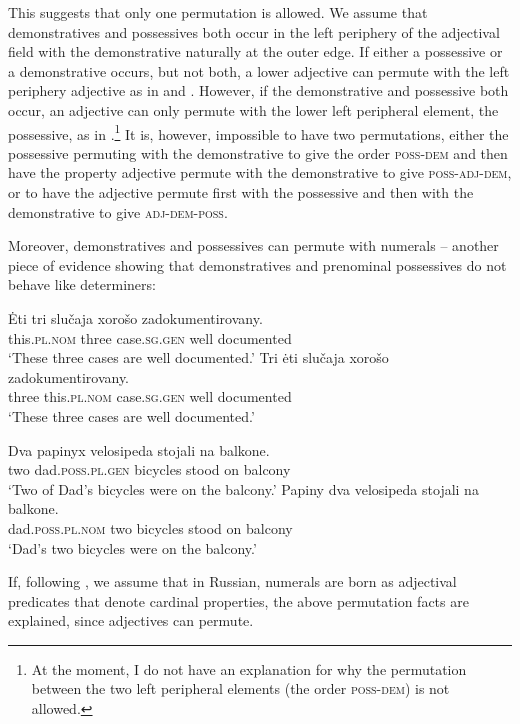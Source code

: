 \documentclass[output=paper,
colorlinks,
citecolor=brown,
newtxmath
]{langscibook}
\begin{document}
\noindent This suggests that only one permutation is allowed. We assume that demonstratives and possessives both occur in the left periphery of the adjectival field with the demonstrative naturally at the outer edge. If either a possessive or a demonstrative occurs, but not both, a lower adjective can permute with the left periphery adjective as in  and . However, if the demonstrative and possessive both occur, an adjective can only permute with the lower left peripheral element, the possessive, as in .\footnote{At the moment, I do not have an explanation for why the permutation between the two left peripheral elements (the order \textsc{poss-dem}) is not allowed.} It is, however, impossible to have two permutations, either the possessive permuting with the demonstrative to give the order \textsc{poss-dem} and then have the property adjective permute with the demonstrative to give \textsc{poss-adj-dem}, or to have the adjective permute first with the possessive and then with the demonstrative to give \textsc{adj-dem-poss}.

Moreover, demonstratives and possessives can permute with numerals -- another piece of evidence showing that demonstratives and prenominal possessives do not behave like determiners:


\ea
    \ea \gll Ėti tri slučaja xorošo zadokumentirovany.\\
    this.\textsc{pl.nom} three case.\textsc{sg.gen} well documented\\
    \glt `These three cases are well documented.'
    \ex \gll Tri ėti slučaja xorošo zadokumentirovany.\\
    three this.\textsc{pl.nom} case.\textsc{sg.gen} well documented\\
    \glt `These three cases are well documented.'
\z\z


\ea
    \ea \gll Dva papinyx velosipeda stojali na balkone.\\
    two dad.\textsc{poss.pl.gen} bicycles stood on balcony\\
    \glt `Two of Dad's bicycles were on the balcony.'
    \ex \gll Papiny dva velosipeda stojali na balkone.\\
    dad.\textsc{poss.pl.nom} two bicycles stood on balcony\\
    \glt `Dad's two bicycles were on the balcony.'
\z\z

\noindent If, following \citet{Khrizman2016}, we assume that in Russian, numerals are born as adjectival predicates that denote cardinal properties, the above permutation facts are explained, since adjectives can permute.
\end{document}
